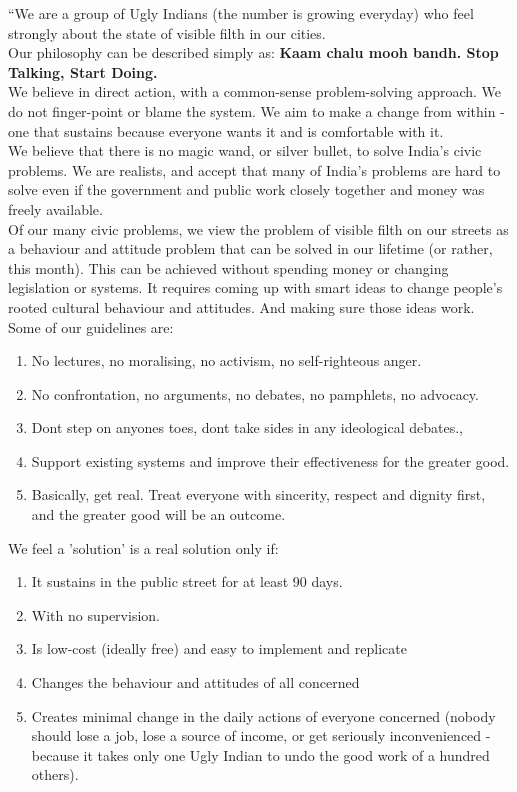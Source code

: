 \documentclass[10pt]{article}
\begin{document}
``We are a group of Ugly Indians (the number is growing everyday) who feel strongly about the state of visible filth in our cities.\\
Our philosophy can be described simply as: \textbf{Kaam chalu mooh bandh. Stop Talking, Start Doing.}\\
We believe in direct action, with a common-sense problem-solving approach. We do not finger-point or blame the system. We aim to make a change from within - one that sustains because everyone wants it and is comfortable with it.\\
We believe that there is no magic wand, or silver bullet, to solve India's civic problems. We are realists, and accept that many of India's problems are hard to solve even if the government and public work closely together and money was freely available.\\
Of our many civic problems, we view the problem of visible filth on our streets as a behaviour and attitude problem that can be solved in our lifetime (or rather, this month). This can be achieved without spending money or changing legislation or systems. It requires coming up with smart ideas to change people's rooted cultural behaviour and attitudes. And making sure those ideas work.\\
Some of our guidelines are:
\begin{enumerate}
\item No lectures, no moralising, no activism, no self-righteous anger.
\item No confrontation, no arguments, no debates, no pamphlets, no advocacy.
\item Dont step on anyones toes, dont take sides in any ideological debates.,
\item Support existing systems and improve their effectiveness for the greater good.
\item Basically, get real. Treat everyone with sincerity, respect and dignity first, and the greater good will be an outcome.
\end{enumerate}
We feel a 'solution' is a real solution only if:
\begin{enumerate}
\item It sustains in the public street for at least 90 days.
\item With no supervision.
\item Is low-cost (ideally free) and easy to implement and replicate
\item Changes the behaviour and attitudes of all concerned
\item Creates minimal change in the daily actions of everyone concerned
    (nobody should lose a job, lose a source of income, or get seriously
    inconvenienced - because it takes only one Ugly Indian to undo the
    good work of a hundred others).
\end{enumerate}
\end{document}
